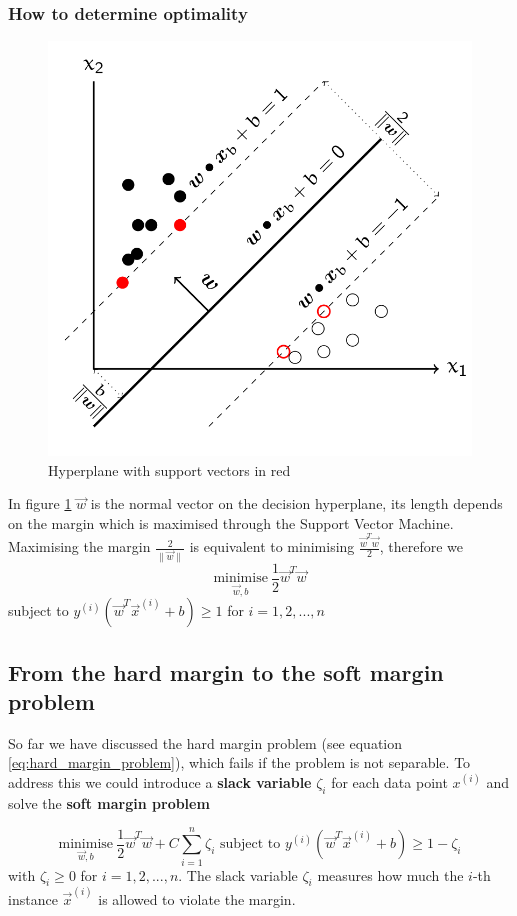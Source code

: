 \documentclass[a4paper, 11pt]{article}
\begin{document}
\subsubsection{How to determine optimality}

\begin{figure}[htb!]
	\centering
	\includegraphics[keepaspectratio, width=0.4\linewidth]{Pictures/support_vector_machine_hyperplane}
	\caption{Hyperplane with support vectors in red}
	\label{fig:supportvectormachinehyperplane}
\end{figure}

In figure \ref{fig:supportvectormachinehyperplane} $\vec{w}$ is the normal vector on the decision hyperplane, its length depends on the margin which is
maximised through the Support Vector Machine. Maximising the margin $\frac{2}{\| \vec{w} \|}$ is equivalent to minimising $\frac{\vec{w}^T \vec{w}}{2}$, therefore we
\begin{equation}\label{eq:hard_margin_problem}
	\underset{\vec{w}, b}{\text{minimise}}\ \frac{1}{2}\vec{w}^T \vec{w}
\end{equation}
\noindent
subject to $y^{(i)}(\vec{w}^T \vec{x}^{(i)}+b)\geq 1$ for $i = 1,2,...,n$


\subsection{From the hard margin to the soft margin problem}

So far we have discussed the hard margin problem (see equation \ref{eq:hard_margin_problem}), which fails if the problem is not separable. To address this we could introduce a \textbf{slack variable} $\zeta_i$ for each data point $x^{(i)}$ and solve the \textbf{soft margin problem}

\begin{equation}\label{eq:soft_margin_problem}
	\underset{\vec{w}, b}{\text{minimise}}\ \frac{1}{2}\vec{w}^T \vec{w} + C\sum_{i=1}^{n}\zeta_i \text{ subject to } y^{(i)}(\vec{w}^T \vec{x}^{(i)} + b) \geq 1 - \zeta_i
\end{equation}
\noindent
with $\zeta_i \geq 0$ for $i=1,2,...,n$. The slack variable $\zeta_i$ measures how much the $i$-th instance $\vec{x}^{(i)}$ is allowed to violate the margin.
\end{document}
